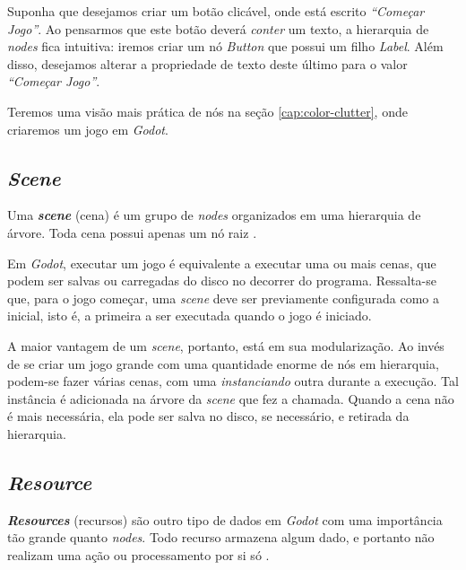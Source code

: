 Suponha que desejamos criar um botão clicável, onde está escrito \textit{``Começar Jogo''}. Ao pensarmos que este botão deverá \emph{conter} um texto, a hierarquia de \textit{nodes} fica intuitiva: iremos criar um nó \textit{Button} que possui um filho \textit{Label}. Além disso, desejamos alterar a propriedade de texto deste último para o valor \textit{``Começar Jogo''}.

Teremos uma visão mais prática de nós na seção \ref{cap:color-clutter}, onde criaremos um jogo em \textit{Godot}.


\subsection{\textit{Scene}}

Uma \textbf{\textit{scene}} (cena) é um grupo de \textit{nodes} organizados em uma hierarquia de árvore. Toda cena possui apenas um nó raiz \citep{godotScene}.

Em \textit{Godot}, executar um jogo é equivalente a executar uma ou mais cenas, que podem ser salvas ou carregadas do disco no decorrer do programa. Ressalta-se que, para o jogo começar, uma \textit{scene} deve ser previamente configurada como a inicial, isto é, a primeira a ser executada quando o jogo é iniciado.

A maior vantagem de um \textit{scene}, portanto, está em sua modularização. Ao invés de se criar um jogo grande com uma quantidade enorme de nós em hierarquia, podem-se fazer várias cenas, com uma \emph{instanciando} outra durante a execução. Tal instância é adicionada na árvore da \textit{scene} que fez a chamada. Quando a cena não é mais necessária, ela pode ser salva no disco, se necessário, e retirada da hierarquia.



\subsection{\textit{Resource}}

\textbf{\textit{Resources}} (recursos) são outro tipo de dados em \textit{Godot} com uma importância tão grande quanto \textit{nodes}. Todo recurso armazena algum dado, e portanto não realizam uma ação ou processamento por si só \citep{godotResource}.

